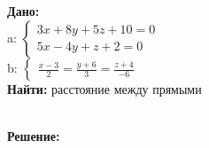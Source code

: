 \documentclass{article}
\begin{document}
\begin{minipage}[t]{0.45\textwidth}

\textbf{Дано:}\\ 
a: \begin{math}
  \begin{cases}
    3x+ 8y + 5z + 10 = 0\\ 
    5x - 4y + z + 2 = 0
  \end{cases}
\end{math}\\
b: \begin{math}
  \begin{cases}
    \frac{x-3}{2} = \frac{y+6}{3} = \frac{z+4}{-6}
  \end{cases}
\end{math}\\

\textbf{Найти: }расстояние между прямыми
\end{minipage}
\begin{minipage}[t]{0.45\textwidth}
  \vspace{-\baselineskip} %

\begin{center}
\end{center}
\end{minipage}
\\
\textbf{Решение:}
\end{document}
